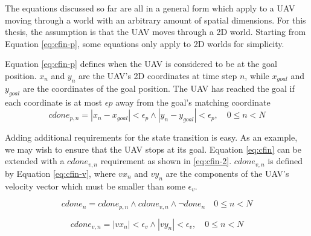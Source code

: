 The equations discussed so far are all in a general form which apply to a UAV moving through a world with an arbitrary amount of spatial dimensions. For this thesis, the assumption is that the UAV moves through a 2D world. Starting from Equation \ref{eq:cfin-p}, some equations only apply to 2D worlds for simplicity. 
\par
Equation \ref{eq:cfin-p} defines when the UAV is considered to be at the goal position. $x_n$ and $y_n$ are the UAV's 2D coordinates at time step $n$, while $x_{goal}$ and $y_{goal}$ are the coordinates of the goal position. The UAV has reached the goal if each coordinate is at most $\epsilon{p}$ away from the goal's matching coordinate
\begin{equation}
\label{eq:cfin-p}
cdone_{p,n} = |x_{n} - x_{goal}| < \epsilon_{p} \wedge  |y_{n} - y_{goal}| < \epsilon_{p}, \quad 0 \leq n < N
\end{equation}

Adding additional requirements for the state transition is easy. As an example, we may wish to ensure that the UAV stops at its goal. Equation \ref{eq:cfin} can be extended with a $cdone_{v,n}$ requirement as shown in \ref{eq:cfin-2}. $cdone_{v,n}$ is defined by Equation \ref{eq:cfin-v}, where $vx_n$ and $vy_n$ are the components of the UAV's velocity vector which must be smaller than some $\epsilon_v$.

\begin{equation}
\label{eq:cfin-2}
cdone_n =  cdone_{p,n} \wedge cdone_{v,n} \wedge \neg done_n\quad 0 \leq n < N
\end{equation}

\begin{equation}
\label{eq:cfin-v}
cdone_{v,n} = |vx_{n}| < \epsilon_{v} \wedge  |vy_{n}| < \epsilon_{v}, \quad 0 \leq n < N
\end{equation}
